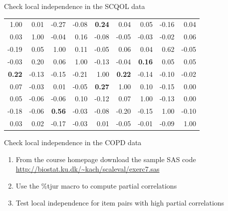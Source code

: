 \documentclass{beamer}
\begin{document}
\begin{frame}{Check local independence in the SCQOL data}
\begin{center}
\begin{tabular}{|rrrrrrrrr|}
\hline
 1.00 & 0.01 &-0.27 &-0.08 &{\bf 0.24} & 0.04 & 0.05 &-0.16 & 0.04 \\
 0.03 & 1.00 &-0.04 & 0.16 &-0.08 &-0.05 &-0.03 &-0.02 & 0.06 \\
-0.19 & 0.05 & 1.00 & 0.11 &-0.05 & 0.06 & 0.04 & 0.62 &-0.05 \\
-0.03 & 0.20 & 0.06 & 1.00 &-0.13 &-0.04 & {\bf 0.16} & 0.05 & 0.05 \\
{\bf  0.22} &-0.13 &-0.15 &-0.21 & 1.00 & {\bf 0.22} &-0.14 &-0.10 &-0.02 \\
 0.07 &-0.03 & 0.01 &-0.05 & {\bf 0.27} & 1.00 & 0.10 &-0.15 & 0.00 \\
 0.05 &-0.06 &-0.06 & 0.10 &-0.12 & 0.07 & 1.00 &-0.13 & 0.00 \\
-0.18 &-0.06 & {\bf 0.56} &-0.03 &-0.08 &-0.20 &-0.15 & 1.00 &-0.10 \\
 0.03 & 0.02 &-0.17 &-0.03 & 0.01 &-0.05 &-0.01 &-0.09 & 1.00 \\
\hline
\end{tabular}
\end{center}
\end{frame}


\begin{frame}{Check local independence in the COPD data}
\begin{enumerate}
    \item From the course homepage download the sample SAS code \url{http://biostat.ku.dk/~kach/scaleval/exerc7.sas}
    \item Use the {\%}tjur macro to compute partial correlations
    \item Test local independence for item pairs with high partial correlations
\end{enumerate}
\end{frame}
\end{document}
